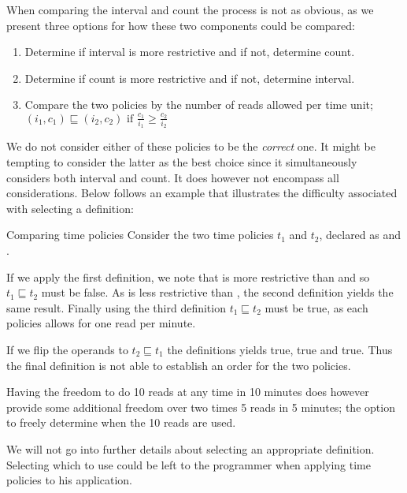 When comparing the interval and count the process is not as obvious, as we present three options for how these two components could be compared:

\begin{enumerate}
  \item Determine if interval is more restrictive and if not, determine count.
  \item Determine if count is more restrictive and if not, determine interval.
  \item Compare the two policies by the number of reads allowed per time unit; \\
  $(i_1, c_1) \sqsubseteq (i_2, c_2) \text{ if } \displaystyle\frac{c_1}{i_1} \geq \frac{c_2}{i_2}$
\end{enumerate}

We do not consider either of these policies to be the \textit{correct} one.
It might be tempting to consider the latter as the best choice since it simultaneously considers both interval and count.
It does however not encompass all considerations.
Below follows an example that illustrates the difficulty associated with selecting a definition:

\begin{example}{Comparing time policies}
  Consider the two time policies $t_1$ and $t_2$, declared as  and .

  If we apply the first definition, we note that  is more restrictive than  and so $t_1 \sqsubseteq t_2$ must be false.
  As  is less restrictive than , the second definition yields the same result.
  Finally using the third definition $t_1 \sqsubseteq t_2$ must be true, as each policies allows for one read per minute.

  If we flip the operands to $t_2 \sqsubseteq t_1$ the definitions yields true, true and true.
  Thus the final definition is not able to establish an order for the two policies.

  Having the freedom to do 10 reads at any time in 10 minutes does however provide some additional freedom over two times 5 reads in 5 minutes; the option to freely determine when the 10 reads are used.
\end{example}

We will not go into further details about selecting an appropriate definition.
Selecting which to use could be left to the programmer when applying time policies to his application.

